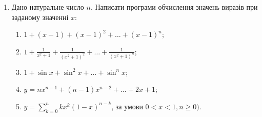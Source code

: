 \documentclass[]{article}
\makeatletter
\newcommand{\xslalph}[1]{\expandafter\@xslalph\csname c@#1\endcsname}
\newcommand{\@xslalph}[1]{%
    \ifcase#1\or а\or б\or в\or г\or д\or e\or є\or ж\or з\or i%
    \or й\or к\or л\or м\or н\or о\or п\or р\or с\or т%
    \or у\or ф\or х\or ц\or ч\or ш\or ю\or я\or аа\or бб\or вв %
    \else\@ctrerr\fi%
}
\makeatother
\begin{document}
\begin{enumerate}
\item
  Дано натуральне число \(n\). Написати програми обчислення
  значень виразів при заданому значенні \(x\):

\begin{enumerate}[label=\xslalph*)]
\item

\(1 + (x - 1) + (x - 1)^{2} + \ldots + (x - 1)^{n}\);
\item
\(1 + \frac{1}{x^{2} + 1} + \frac{1}{(x^{2} + 1)^{2}} + \ldots + \frac{1}{(x^{2} + 1)^{n}}\);
\item
\(1 + \sin{x} + \sin^2{x} + \ldots + \sin^{n}{x}\);
\item
\(y = nx^{n - 1} + (n - 1)x^{n - 2} + \ldots + 2x + 1\);
\item
\(y = \sum\limits_{k = 0}^{n}{kx^{k}(1 - x)^{n - k}}\), за умови \(0 < x < 1,n \geq 0)\).

\end{enumerate}


\end{enumerate}
\end{document}

